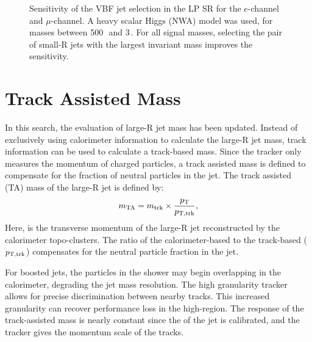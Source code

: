 \begin{figure}[htb]
\caption[Sensitivity of selection method of vector boson fusion jets in the low purity signal region]{Sensitivity of the VBF jet selection in the LP SR for the \protect{} $e$-channel and \protect{} $\mu$-channel. A heavy scalar Higgs (NWA) model was used, for masses between 500\,\GeV\, and 3\,\TeV. For all signal masses, selecting the pair of small-R jets with the largest invariant mass improves the sensitivity.}
\label{fig:mjj_lp}
\end{figure}


%
\clearpage
\section{Track Assisted Mass}
\label{sec:TAmass}
In this search, the evaluation of large-R jet mass has been updated. Instead of exclusively using calorimeter information to calculate the large-R jet mass, track information can be used to calculate a track-based mass. Since the tracker only measures the momentum of charged particles, a track assisted mass is defined to compensate for the fraction of neutral particles in the jet. The track assisted (TA) mass of the large-R jet is defined by:
\begin{equation}
m_{\textrm{TA}} = m_{{\rm trk}} \times \frac{p_{\text{T}}}{p_{{\rm T,trk}}},
\end{equation}
Here, \pt is the transverse momentum of the large-R jet reconstructed by the calorimeter topo-clusters.  The ratio of the calorimeter-based \pT to the track-based \pT ($p_{{\rm T,trk}}$) compensates for the neutral particle fraction in the jet.

For boosted jets, the particles in the shower may begin overlapping in the calorimeter, degrading the jet mass resolution. The high granularity tracker allows for precise discrimination between nearby tracks. This increased granularity can recover performance loss in the high-\pT region. The response of the track-assisted mass is nearly constant since the \pt of the jet is calibrated, and the tracker gives the momentum scale of the tracks.

